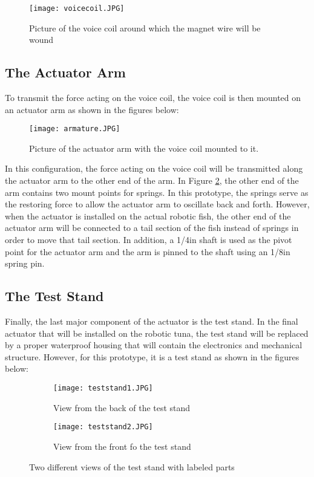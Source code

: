 \begin{figure}[h!]
\centering
\texttt{[image: voicecoil.JPG]}
\caption{Picture of the voice coil around which the magnet wire will be wound}
\label{fig:voicecoil}
\end{figure}

\newpage

\subsection{The Actuator Arm} \label{actuatorarm}

To transmit the force acting on the voice coil, the voice coil is then mounted on an actuator arm as shown in the figures below:

\begin{figure}[h!]
\centering
\texttt{[image: armature.JPG]}
\caption{Picture of the actuator arm with the voice coil mounted to it.}
\label{fig:armature}
\end{figure}

\noindent In this configuration, the force acting on the voice coil will be transmitted along the actuator arm to the other end of the arm. In Figure \ref{fig:armature}, the other end of the arm contains two mount points for springs. In this prototype, the springs serve as the restoring force to allow the actuator arm to oscillate back and forth. However, when the actuator is installed on the actual robotic fish, the other end of the actuator arm will be connected to a tail section of the fish instead of springs in order to move that tail section. In addition, a 1/4in shaft is used as the pivot point for the actuator arm and the arm is pinned to the shaft using an 1/8in spring pin.

\subsection{The Test Stand}
Finally, the last major component of the actuator is the test stand. In the final actuator that will be installed on the robotic tuna, the test stand will be replaced by a proper waterproof housing that will contain the electronics and mechanical structure. However, for this prototype, it is a test stand as shown in the figures below:

\newpage
\begin{figure}[h!]
\centering
\begin{subfigure}{.5\textwidth}
  \centering
  \texttt{[image: teststand1.JPG]}
  \caption{View from the back of the test stand}
  \label{fig:teststand1}
\end{subfigure}%
\begin{subfigure}{.5\textwidth}
  \centering
  \texttt{[image: teststand2.JPG]}
  \caption{View from the front fo the test stand}
  \label{teststand2}
\end{subfigure}
\caption{Two different views of the test stand with labeled parts}
\label{fig:teststandviews}
\end{figure}

